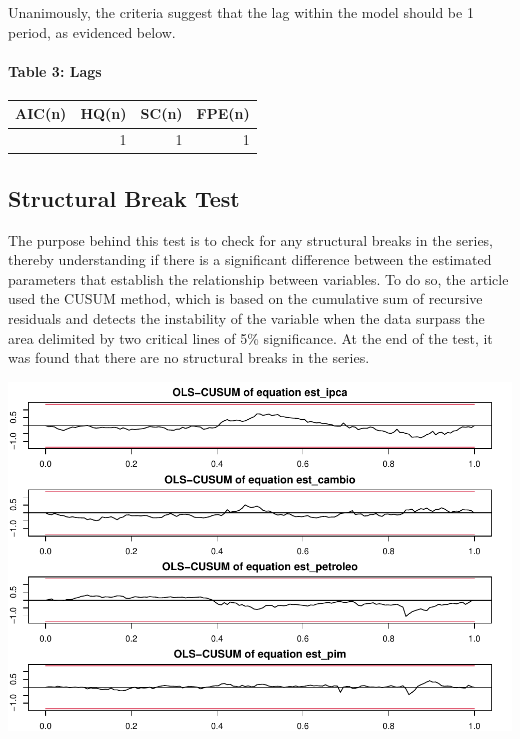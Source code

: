 \documentclass[12pt]{article}
\begin{document}
Unanimously, the criteria suggest that the lag within the model should
be 1 period, as evidenced below.

\hypertarget{table-3-lags}{%
\paragraph{Table 3: Lags}\label{table-3-lags}}

\begin{longtable}[]{@{}rrrr@{}}
\toprule\noalign{}
AIC(n) & HQ(n) & SC(n) & FPE(n) \\
\midrule\noalign{}
\endhead
\bottomrule\noalign{}
\endlastfoot
1 & 1 & 1 & 1 \\
\end{longtable}

\hypertarget{structural-break-test}{%
\subsection{Structural Break Test}\label{structural-break-test}}

The purpose behind this test is to check for any structural breaks in
the series, thereby understanding if there is a significant difference
between the estimated parameters that establish the relationship between
variables. To do so, the article used the CUSUM method, which is based
on the cumulative sum of recursive residuals and detects the instability
of the variable when the data surpass the area delimited by two critical
lines of 5\% significance. At the end of the test, it was found that
there are no structural breaks in the series.

\includegraphics{article_files/figure-latex/unnamed-chunk-4-1.pdf}
\end{document}
